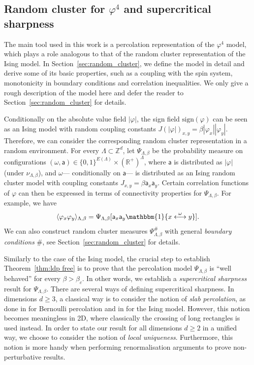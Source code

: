 \documentclass[11pt,a4paper]{article}
\theoremstyle{definition}
\numberwithin{equation}{section}
\newcommand\Z{\mathbb{Z}}
\begin{document}
\subsection{Random cluster for $\varphi^4$ and supercritical sharpness}

The main tool used in this work is a percolation representation of the $\varphi^4$ model, which plays a role analogous to that of the random cluster representation of the Ising model. In Section~\ref{sec:random_cluster}, we define the model in detail and derive some of its basic properties, such as a coupling with the spin system, monotonicity in boundary conditions and correlation inequalities. 
We only give a rough description of the model here and defer the reader to Section~\ref{sec:random_cluster} for details.


Conditionally on the absolute value field $|\varphi|$, the sign field $\mathrm{sign}(\varphi)$ can be seen as an Ising model with random coupling constants $J(|\varphi|)_{x,y}=\beta |\varphi_x||\varphi_y|$. Therefore, we can consider the corresponding random cluster representation in a random environment. For every $\Lambda\subset \Z^d$, let $\Psi_{\Lambda,\beta}$ be the probability measure on configurations $(\omega,\mathsf{a})\in \{0,1\}^{E(\Lambda)} \times (\mathbb R^+)^\Lambda$, where $\mathsf{a}$ is distributed as $|\varphi|$ (under $\nu_{\Lambda,\beta}$), and $\omega$--- conditionally on $\mathsf{a}$--- is distributed as an Ising random cluster model with coupling constants $J_{x,y}=\beta \mathsf{a}_x \mathsf{a}_y$. Certain correlation functions of $\varphi$ can then be expressed in terms of connectivity properties for $\Psi_{\Lambda,\beta}$. For example, we have 
\begin{equation}
\langle \varphi_x \varphi_y\rangle_{\Lambda,\beta}= \Psi_{\Lambda,\beta}[ \mathsf{a}_x \mathsf{a}_y \mathbbm{1}\{x \overset{\omega}{\longleftrightarrow} y\}].    
\end{equation}
We can also construct random cluster measures $\Psi^\#_{\Lambda,\beta}$ with general \emph{boundary conditions} $\#$, see Section~\ref{sec:random_cluster} for details. 


Similarly to the case of the Ising model, the crucial step to establish Theorem~\ref{thm:ldp free} is to prove that the percolation model $\Psi_{\Lambda,\beta}$ is ``well behaved'' for every $\beta>\beta_c$. In other words, we establish a \emph{supercritical sharpness} result for $\Psi_{\Lambda,\beta}$. There are several ways of defining supercritical sharpness. In dimensions $d\geq3$, a classical way is to consider the notion of \emph{slab percolation}, as done in \cite{GM90} for Bernoulli percolation and in \cite{Bod05} for the Ising model. However, this notion becomes meaningless in 2D, where classically the crossing of long rectangles is used instead. 
In order to state our result for all dimensions $d\geq 2$ in a unified way, we choose to consider the notion of \emph{local uniqueness}. Furthermore, this notion is more handy when performing renormalisation arguments to prove non-perturbative results.
\end{document}
